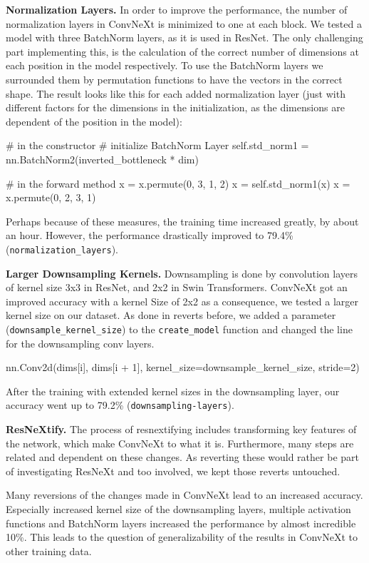 \documentclass{article}
\begin{document}
\textbf{Normalization Layers.}
In order to improve the performance, the number of normalization layers in ConvNeXt is minimized to one at each block.
We tested a model with three BatchNorm layers, as it is used in ResNet.
The only challenging part implementing this, is the calculation of the correct number of dimensions at each position in the model respectively.
To use the BatchNorm layers we surrounded them by permutation functions to have the vectors in the correct shape.
The result looks like this for each added normalization layer (just with different factors for the dimensions in the initialization, as the dimensions are dependent of the position in the model):
\begin{python}
    # in the constructor
    # initialize BatchNorm Layer
    self.std_norm1 = nn.BatchNorm2(inverted_bottleneck * dim)

    # in the forward method
    x = x.permute(0, 3, 1, 2)
    x = self.std_norm1(x)
    x = x.permute(0, 2, 3, 1)
\end{python}
Perhaps because of these measures, the training time increased greatly, by about an hour.
However, the performance drastically improved to 79.4\% (\texttt{normalization\_layers}).

\textbf{Larger Downsampling Kernels.}
Downsampling is done by convolution layers of kernel size 3x3 in ResNet, and 2x2 in Swin Transformers.
ConvNeXt got an improved accuracy with a kernel Size of 2x2 as a consequence, we tested a larger kernel size on our dataset.
As done in reverts before, we added a parameter (\texttt{downsample\_kernel\_size}) to the \texttt{create\_model} function and changed the line for the downsampling conv layers.
\begin{python}
    nn.Conv2d(dims[i], dims[i + 1],
    kernel_size=downsample_kernel_size, stride=2)
\end{python}
After the training with extended kernel sizes in the downsampling layer, our accuracy went up to 79.2\% (\texttt{downsampling-layers}).

\textbf{ResNeXtify.}
The process of resnextifying includes transforming key features of the network, which make ConvNeXt to what it is.
Furthermore, many steps are related and dependent on these changes.
As reverting these would rather be part of investigating ResNeXt and too involved, we kept those reverts untouched.

Many reversions of the changes made in ConvNeXt lead to an increased accuracy.
Especially increased kernel size of the downsampling layers, multiple activation functions and BatchNorm layers increased the performance by almost incredible 10\%.
This leads to the question of generalizability of the results in ConvNeXt to other training data.
\end{document}
